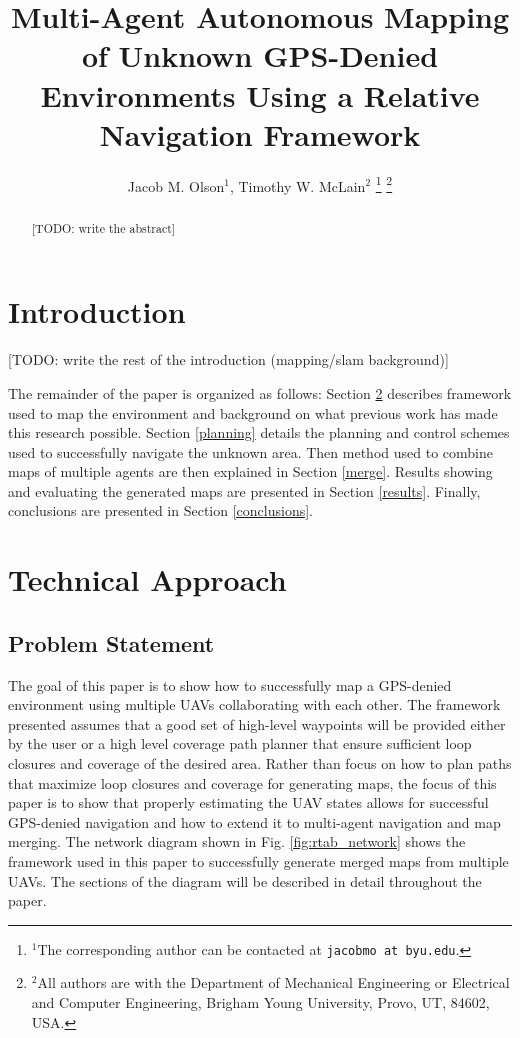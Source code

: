 \documentclass[letterpaper, 10 pt, conference]{ieeeconf}  %
\title{\LARGE \bf
Multi-Agent Autonomous Mapping of Unknown GPS-Denied Environments Using a Relative Navigation Framework}
\author{Jacob M. Olson$^{1}$, Timothy W. McLain$^{2}$ \todo{include Matthiew Labbe?}%
\thanks{$^{1}$The corresponding author can be contacted at
        {\tt\small jacobmo at byu.edu}.}%
\thanks{$^{2}$All authors are with the Department of Mechanical Engineering or Electrical and Computer Engineering,
        Brigham Young University, Provo, UT, 84602, USA.}%
}
\newcommand{\todo}[1]{{\color{blue}[TODO: #1]}}
\begin{document}
\maketitle
\thispagestyle{empty}
\pagestyle{empty}


\begin{abstract}

\todo{write the abstract}

\end{abstract}


\section{Introduction}

\todo{write the rest of the introduction (mapping/slam background)}

The remainder of the paper is organized as follows: Section \ref{approach} describes framework used to map the environment and background on what previous work has made this research possible. Section \ref{planning} details the planning and control schemes used to successfully navigate the unknown area. Then method used to combine maps of multiple agents are then explained in Section \ref{merge}. Results showing and evaluating the generated maps are presented in Section \ref{results}. Finally, conclusions are presented in Section \ref{conclusions}.

\section{Technical Approach}\label{approach}

\subsection{Problem Statement}

The goal of this paper is to show how to successfully map a GPS-denied environment using multiple UAVs collaborating with each other. The framework presented assumes that a good set of high-level waypoints will be provided either by the user or a high level coverage path planner that ensure sufficient loop closures and coverage of the desired area. Rather than focus on how to plan paths that maximize loop closures and coverage for generating maps, the focus of this paper is to show that properly estimating the UAV states allows for successful GPS-denied navigation and how to extend it to multi-agent navigation and map merging. The network diagram shown in Fig. \ref{fig:rtab_network} shows the framework used in this paper to successfully generate merged maps from multiple UAVs. The sections of the diagram will be described in detail throughout the paper.
\end{document}
